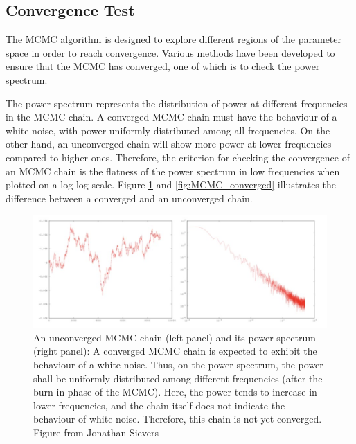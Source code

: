 \documentclass[12pt, TexShade, letterpaper]{report}
\begin{document}
\subsection{Convergence Test}
The MCMC algorithm is designed to explore different regions of the parameter space in order to reach convergence. Various methods have been developed to ensure that the MCMC has converged, one of which is to check the power spectrum.\par
The power spectrum represents the distribution of power at different frequencies in the MCMC chain. A converged MCMC chain must have the behaviour of a white noise, with power uniformly distributed among all frequencies. On the other hand, an unconverged chain will show more power at lower frequencies compared to higher ones. Therefore, the criterion for checking the convergence of an MCMC chain is the flatness of the power spectrum in low frequencies when plotted on a log-log scale. Figure \ref{fig:MCMC_unconverged} and \ref{fig:MCMC_converged} illustrates the difference between a converged and an unconverged chain.\par
\begin{figure}[h!]
\centering
\includegraphics[scale =0.9]{mcmc_uncoverged.jpg}
\caption[An unconverged MCMC chain and its power spectrum]{An unconverged MCMC chain (left panel) and its power spectrum (right panel): A converged MCMC chain is expected to exhibit the behaviour of a white noise. Thus, on the power spectrum, the power shall be uniformly distributed among different frequencies (after the burn-in phase of the MCMC). Here, the power tends to increase in lower frequencies, and the chain itself does not indicate the behaviour of white noise. Therefore, this chain is not yet converged. Figure from Jonathan Sievers}
\label{fig:MCMC_unconverged}
\end{figure}
\end{document}
